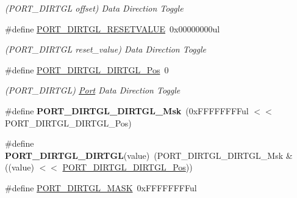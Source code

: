 \begin{DoxyCompactItemize}
\begin{DoxyCompactList}\small\item\em (P\+O\+R\+T\+\_\+\+D\+I\+R\+T\+G\+L offset) Data Direction Toggle \end{DoxyCompactList}\item 
\hypertarget{group___s_a_m_l21___p_o_r_t_gabf69bb8e2dcdb2658c393352c4ab1451}{}\#define \hyperlink{group___s_a_m_l21___p_o_r_t_gabf69bb8e2dcdb2658c393352c4ab1451}{P\+O\+R\+T\+\_\+\+D\+I\+R\+T\+G\+L\+\_\+\+R\+E\+S\+E\+T\+V\+A\+L\+U\+E}~0x00000000ul\label{group___s_a_m_l21___p_o_r_t_gabf69bb8e2dcdb2658c393352c4ab1451}

\begin{DoxyCompactList}\small\item\em (P\+O\+R\+T\+\_\+\+D\+I\+R\+T\+G\+L reset\+\_\+value) Data Direction Toggle \end{DoxyCompactList}\item 
\hypertarget{group___s_a_m_l21___p_o_r_t_gae76952ebb5d27345861883e92a0b4580}{}\#define \hyperlink{group___s_a_m_l21___p_o_r_t_gae76952ebb5d27345861883e92a0b4580}{P\+O\+R\+T\+\_\+\+D\+I\+R\+T\+G\+L\+\_\+\+D\+I\+R\+T\+G\+L\+\_\+\+Pos}~0\label{group___s_a_m_l21___p_o_r_t_gae76952ebb5d27345861883e92a0b4580}

\begin{DoxyCompactList}\small\item\em (P\+O\+R\+T\+\_\+\+D\+I\+R\+T\+G\+L) \hyperlink{struct_port}{Port} Data Direction Toggle \end{DoxyCompactList}\item 
\hypertarget{group___s_a_m_l21___p_o_r_t_ga3f760de671e765111e9c760fdec994f5}{}\#define {\bfseries P\+O\+R\+T\+\_\+\+D\+I\+R\+T\+G\+L\+\_\+\+D\+I\+R\+T\+G\+L\+\_\+\+Msk}~(0x\+F\+F\+F\+F\+F\+F\+F\+Ful $<$$<$ P\+O\+R\+T\+\_\+\+D\+I\+R\+T\+G\+L\+\_\+\+D\+I\+R\+T\+G\+L\+\_\+\+Pos)\label{group___s_a_m_l21___p_o_r_t_ga3f760de671e765111e9c760fdec994f5}

\item 
\hypertarget{group___s_a_m_l21___p_o_r_t_gab6900b708762f7a3aaef111ac5929366}{}\#define {\bfseries P\+O\+R\+T\+\_\+\+D\+I\+R\+T\+G\+L\+\_\+\+D\+I\+R\+T\+G\+L}(value)~(P\+O\+R\+T\+\_\+\+D\+I\+R\+T\+G\+L\+\_\+\+D\+I\+R\+T\+G\+L\+\_\+\+Msk \& ((value) $<$$<$ \hyperlink{group___s_a_m_l21___p_o_r_t_gae76952ebb5d27345861883e92a0b4580}{P\+O\+R\+T\+\_\+\+D\+I\+R\+T\+G\+L\+\_\+\+D\+I\+R\+T\+G\+L\+\_\+\+Pos}))\label{group___s_a_m_l21___p_o_r_t_gab6900b708762f7a3aaef111ac5929366}

\item 
\hypertarget{group___s_a_m_l21___p_o_r_t_gaad67e44b66d1e6d214a468d19fe5c37b}{}\#define \hyperlink{group___s_a_m_l21___p_o_r_t_gaad67e44b66d1e6d214a468d19fe5c37b}{P\+O\+R\+T\+\_\+\+D\+I\+R\+T\+G\+L\+\_\+\+M\+A\+S\+K}~0x\+F\+F\+F\+F\+F\+F\+F\+Ful\label{group___s_a_m_l21___p_o_r_t_gaad67e44b66d1e6d214a468d19fe5c37b}


\end{DoxyCompactItemize}
